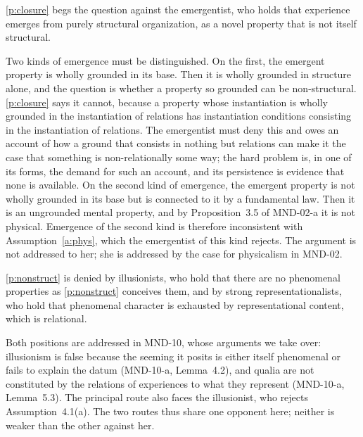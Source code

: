 \documentclass{situationist-preprint}
\begin{document}
\begin{objection}[Emergence]\label{o:emergence}
\ref{p:closure} begs the question against the emergentist, who holds that experience emerges from purely structural organization, as a novel property that is not itself structural.
\end{objection}

\begin{reply}
Two kinds of emergence must be distinguished. On the first, the emergent property is wholly grounded in its base. Then it is wholly grounded in structure alone, and the question is whether a property so grounded can be non-structural. \ref{p:closure} says it cannot, because a property whose instantiation is wholly grounded in the instantiation of relations has instantiation conditions consisting in the instantiation of relations. The emergentist must deny this and owes an account of how a ground that consists in nothing but relations can make it the case that something is non-relationally some way; the hard problem is, in one of its forms, the demand for such an account, and its persistence is evidence that none is available. On the second kind of emergence, the emergent property is not wholly grounded in its base but is connected to it by a fundamental law. Then it is an ungrounded mental property, and by Proposition~3.5 of MND-02-a it is not physical. Emergence of the second kind is therefore inconsistent with Assumption~\ref{a:phys}, which the emergentist of this kind rejects. The argument is not addressed to her; she is addressed by the case for physicalism in MND-02.
\end{reply}

\begin{objection}[Illusionism]\label{o:illusion}
\ref{p:nonstruct} is denied by illusionists, who hold that there are no phenomenal properties as \ref{p:nonstruct} conceives them, and by strong representationalists, who hold that phenomenal character is exhausted by representational content, which is relational.
\end{objection}

\begin{reply}
Both positions are addressed in MND-10, whose arguments we take over: illusionism is false because the seeming it posits is either itself phenomenal or fails to explain the datum (MND-10-a, Lemma~4.2), and qualia are not constituted by the relations of experiences to what they represent (MND-10-a, Lemma~5.3). The principal route also faces the illusionist, who rejects Assumption~4.1(a). The two routes thus share one opponent here; neither is weaker than the other against her.
\end{reply}
\end{document}

